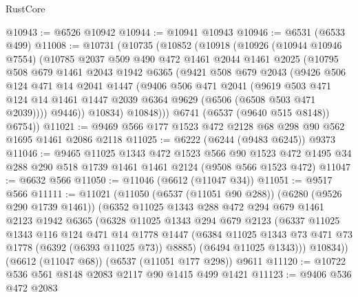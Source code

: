\begin{lexlean}{RustCore}
\begin{coremodule}
@10943 := @6526 @10942
@10944 := @10941 @10943
@10946 := @6531 (@6533 @499)
@11008 := @10731
    (@10735
      (@10852
        (@10918
          (@10926
            (@10944 @10946 @7554)
            (@10785
              @2037
              @509
              @490
              @472
              @1461
              @2044
              @1461
              @2025
              (@10795
                @508
                @679
                @1461
                @2043
                @1942
                @6365
                (@9421
                  @508
                  @679
                  @2043
                  (@9426
                    @506
                    @124
                    @471
                    @14
                    @2041
                    @1447
                    (@9406
                      @506
                      @471
                      @2041
                      (@9619
                        @503
                        @471
                        @124
                        @14
                        @1461
                        @1447
                        @2039
                        @6364
                        @9629
                        (@6506 (@6508 @503 @471 @2039))))
                    @9446))
                @10834)
              @10848)))
        @6741
        (@6537 (@9640 @515 @8148))
        @6754))
@11021 := @9469 @566 @177 @1523 @472 @2128 @68 @298 @90 @562 @1695 @1461 @2086 @2118
@11025 := @6222 (@6244 (@9483 @6245)) @9373
@11046 := @9465
    @11025
    @1343
    @472
    @1523
    @566
    @90
    @1523
    @472
    @1495
    @34
    @288
    @290
    @518
    @1739
    @1461
    @1461
    @2124
    (@9508 @566 @1523 @472)
@11047 := @6632 @566
@11050 := @11046 (@6612 (@11047 @34))
@11051 := @9517 @566
@11111 := @11021
    (@11050
      (@6537 (@11051 @90 @288))
      (@6280 (@9526 @290 @1739 @1461))
      (@6352
        @11025
        @1343
        @288
        @472
        @294
        @679
        @1461
        @2123
        @1942
        @6365
        (@6328
          @11025
          @1343
          @294
          @679
          @2123
          (@6337
            @11025
            @1343
            @116
            @124
            @471
            @14
            @1778
            @1447
            (@6384 @11025 @1343 @73 @471 @73 @1778 (@6392 (@6393 @11025 @73)) @8885)
            (@6494 @11025 @1343)))
        @10834))
    (@6612 (@11047 @68))
    (@6537 (@11051 @177 @298))
    @9611
@11120 := @10722 @536 @561 @8148 @2083 @2117 @90 @1415 @499 @1421
@11123 := @9406 @536 @472 @2083

\end{coremodule}
\end{lexlean}
